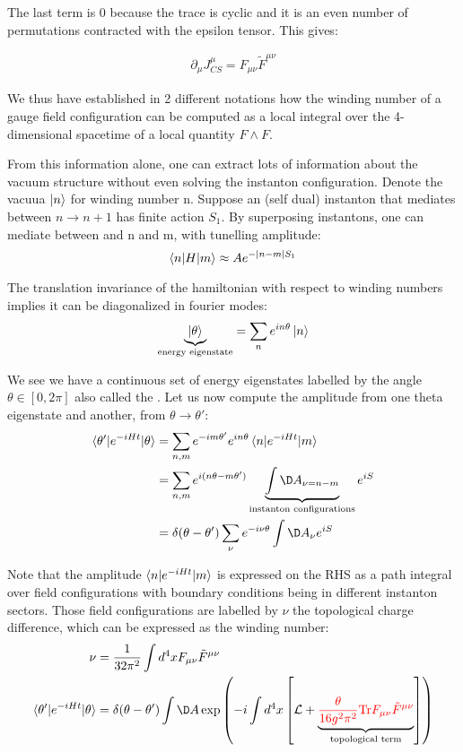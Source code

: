 \documentclass[11pt]{scrartcl}
\begin{document}
The last term is 0 because the trace is cyclic and it is an even number of permutations contracted with the epsilon tensor.  This gives:

\begin{align}
	\partial_\mu J_{CS}^\mu = F_{\mu \nu} \tilde{F}^{\mu \nu}
	\end{align}

We thus have established in 2 different notations how the winding number of a gauge field configuration can be computed as a local integral over the 4-dimensional spacetime of a local quantity $F \wedge F$.


From this information alone, one can extract lots of information about the vacuum structure without even solving the instanton configuration.  Denote the vacuua $\ket{n}$ for winding number n.   Suppose an (self dual) instanton that mediates between $n \rightarrow n+1$ has finite action $S_1$.  By superposing instantons, one can mediate between and n and m, with tunelling amplitude:
\[ \braket{n | H | m} \approx A e^{-|n-m| S_1} \]

The translation invariance of the hamiltonian with respect to winding numbers implies it can be diagonalized in fourier modes:
\[ \underbrace{\ket{ \theta }}_{\text{energy eigenstate}} = \sum_{n} e^{i n \theta} \ket{n} \]

We see we have a continuous set of energy eigenstates labelled by the angle $\theta \in [0, 2 \pi]$ also called the .   Let us now compute the amplitude from one theta eigenstate and another, from $\theta \rightarrow \theta'$:
\begin{align}
	\braket{\theta' |e^{-iHt}| \theta} & = \sum_{n, m} e^{-im \theta'} e^{i n \theta} \braket{n | e^{-i H t}| m} \\
	& = \sum_{n, m} e^{i (n \theta - m \theta')} \underbrace{\int \D A_{\nu = n-m}}_{\text{instanton configurations}} e^{i S} \\
	& = \delta(\theta - \theta') \sum_{\nu} e^{-i \nu \theta} \int \D A_\nu e^{i S}
\end{align}

Note that the amplitude $\braket{n|e^{-iHt}|m}$ is expressed on the RHS as a path integral over field configurations with boundary conditions being in different instanton sectors.  Those field configurations are labelled by $\nu$ the topological charge difference, which can be expressed as the winding number:
\begin{align}
	\nu & = {1 \over 32 \pi^2} \int d^4 x F_{\mu \nu} \tilde{F}^{\mu \nu} \\
	\braket{ \theta' |e^{-iHt} | \theta}  & = \delta(\theta  - \theta') \int \D A
	\exp \left( -{i} \int d^4 x  \left[ \mathcal{L} + \underbrace{\color{red} {\theta \over 16 g^2 \pi^2} \mathrm{Tr} F_{\mu \nu} \tilde{F}^{\mu \nu}}_{\text{topological term}}\right] \right)
\end{align}
\end{document}
